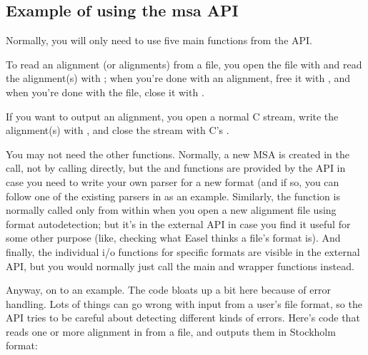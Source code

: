 \subsection{Example of using the msa API}

Normally, you will only need to use five main functions from the API.

To read an alignment (or alignments) from a file, you open the file
with  and read the alignment(s) with
; when you're done with an alignment, free it
with , and when you're done with the file,
close it with . 

If you want to output an alignment, you open a normal C 
stream, write the alignment(s) with , and
close the stream with C's .

You may not need the other functions.  Normally, a new MSA is created
in the  call, not by calling
 directly, but the  and
 functions are provided by the API in case you need
to write your own parser for a new format (and if so, you can follow
one of the existing parsers in  as an example. Similarly,
the  function is normally called
only from within  when you open a new
alignment file using format autodetection; but it's in the external
API in case you find it useful for some other purpose (like, checking
what Easel thinks a file's format is). And finally, the individual i/o
functions for specific formats are visible in the external API, but
you would normally just call the main  and
 wrapper functions instead.

Anyway, on to an example. The code bloats up a bit here because of
error handling. Lots of things can go wrong with input from a user's
file format, so the API tries to be careful about detecting different
kinds of errors. Here's code that reads one or more alignment in from
a file, and outputs them in Stockholm format:

